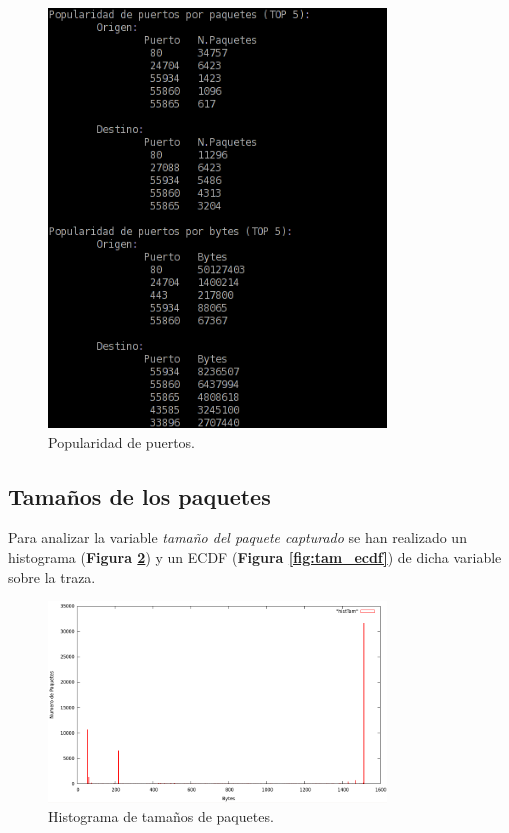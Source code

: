 \documentclass[a4paper, 11pt]{article}	%
\begin{document}
\begin{figure}[H]
\centering
\includegraphics[width=0.8\textwidth]{popularidadPuertos.png}
\caption{Popularidad de puertos.}
\label{fig:popPuertos}
\end{figure}

\subsection{Tamaños de los paquetes}
Para analizar la variable \textit{tamaño del paquete capturado} se han realizado un histograma (\textbf{Figura \ref{fig:tam_hist}}) y un ECDF (\textbf{Figura \ref{fig:tam_ecdf}}) de dicha variable sobre la traza.

\begin{figure}[H]
\centering
\includegraphics[width=0.8\textwidth]{tam_hist.png}
\caption{Histograma de tamaños de paquetes.}
\label{fig:tam_hist}
\end{figure}
\end{document}
